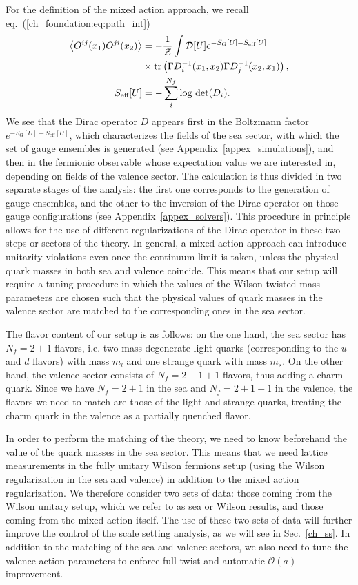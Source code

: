 For the definition of the mixed action approach, we recall eq.~(\ref{ch_foundation:eq:path_int})
\begin{align}
\left<O^{ij}(x_1)O^{ji}(x_2)\right>&=-\frac{1}{\mathcal{Z}}\int\mathcal{D}[U]e^{-S_{\textrm{G}}[U]-S_{\textrm{eff}}[U]} \notag \\
&\times{\textrm{tr}}\left(\Gamma D_i^{-1}(x_1,x_2)\Gamma D_j^{-1}(x_2,x_1)\right),\\
S_{\textrm{eff}}[U]&=-\sum_i^{N_f}\textrm{log det}(D_i).
\end{align} 
We see that the Dirac operator $D$ appears first in the Boltzmann factor $e^{-S_{\textrm{G}}[U]-S_{\textrm{eff}}[U]}$, which characterizes the fields of the sea sector, with which the set of gauge ensembles is generated (see Appendix~\ref{appex_simulations}), and then in the fermionic observable whose expectation value we are interested in, depending on fields of the  valence sector. The calculation is thus divided in two separate stages of the analysis: the first one corresponds to the generation of gauge ensembles, and the other to the inversion of the Dirac operator on those gauge configurations (see Appendix~\ref{appex_solvers}). This procedure in principle allows for the use of different regularizations of the Dirac operator in these two steps or sectors of the theory. In general, a mixed action approach can introduce unitarity violations even once the continuum limit is taken, unless the physical quark masses in both sea and valence coincide. This means that our setup will require a tuning procedure in which the values of the Wilson twisted mass parameters are chosen such that the physical values of quark masses in the valence sector are matched to the corresponding ones in the sea sector.

The flavor content of our setup is as follows: on the one hand, the sea sector has $N_f=2+1$ flavors, i.e. two mass-degenerate light quarks (corresponding to the $u$ and $d$ flavors) with mass $m_l$ and one strange quark with mass $m_s$. On the other hand, the valence sector consists of $N_f=2+1+1$ flavors, thus adding a charm quark. Since we have $N_f=2+1$ in the sea and $N_f=2+1+1$ in the valence, the flavors we need to match are those of the light and strange quarks, treating the charm quark in the valence as a partially quenched flavor. 

In order to perform the matching of the theory, we need to know beforehand the value of the quark masses in the sea sector. This means that we need lattice measurements in the fully unitary Wilson fermions setup (using the Wilson regularization in the sea and valence) in addition to the mixed action regularization. We therefore consider two sets of data: those coming from the Wilson unitary setup, which we refer to as sea or Wilson results, and those coming from the mixed action itself. The use of these two sets of data will further improve the control of the scale setting analysis, as we will see in Sec.~\ref{ch_ss}. In addition to the matching of the sea and valence sectors, we also need to tune the valence action parameters to enforce full twist and automatic $\mathcal{O}(a)$ improvement.

